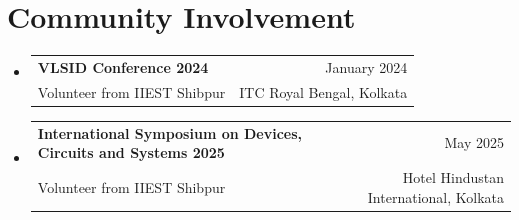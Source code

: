 \documentclass[11pt]{article}
\makeatletter
\newcommand{\CVSubheading}[4]{
  \vspace{-2pt}\item
    \begin{tabular*}{0.97\textwidth}[t]{l@{\extracolsep{\fill}}r}
      \textbf{#1} & #2 \\
      \small#3 & \small #4 \\
    \end{tabular*}\vspace{-7pt}
}
\newcommand{\CVSubHeadingListStart}{\begin{itemize}[leftmargin=0.5cm, label={}]}
\newcommand{\CVSubHeadingListEnd}{\end{itemize}}
\makeatother
\begin{document}
\section{Community Involvement}
  \CVSubHeadingListStart
    \CVSubheading
      {VLSID Conference 2024}{January 2024}
      {Volunteer from IIEST Shibpur}{ITC Royal Bengal, Kolkata}
    \CVSubheading
      {International Symposium on Devices, Circuits and Systems 2025}{May 2025}
      {Volunteer from IIEST Shibpur}{Hotel Hindustan International, Kolkata}
  \CVSubHeadingListEnd

\end{document}
